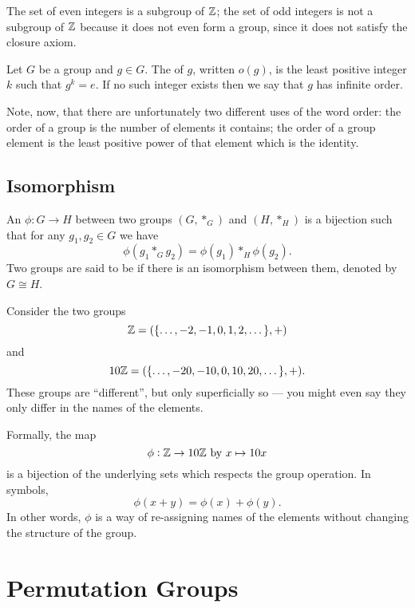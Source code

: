 \begin{example}
The set of even integers is a subgroup of $\mathbb Z$; the set of odd integers is not a subgroup of $\mathbb Z$ because it does not even form a group, since it does not satisfy the closure axiom.
\end{example}

\begin{definition}
Let $G$ be a group and $g \in G$. The  of $g$, written $o(g)$, is the least positive integer $k$ such that $g^k=e$. If no such integer exists then we say that $g$ has infinite order.
\end{definition}

\begin{remark}
Note, now, that there are unfortunately two different uses of the word order: the order of a group is the number of elements it contains; the order of a group element is the least positive power of that element which is the identity.
\end{remark}
\pagebreak

\subsection{Isomorphism}
\begin{definition}[Isomorphism]
An  $\phi: G \to H$ between two groups $(G,\ast_G)$ and $(H,\ast_H)$ is a bijection such that for any $g_1,g_2 \in G$ we have
\[ \phi(g_1 \ast_G g_2) = \phi(g_1) \ast_H \phi(g_2). \]
Two groups are said to be  if there is an isomorphism between them, denoted by $G \cong H$.
\end{definition}

\begin{example}[$\ZZ\cong10\ZZ$]
Consider the two groups
\[ \mathbb Z = (\{\dots, -2, -1, 0, 1, 2, \dots\}, +) \] and
\[ 10\mathbb Z = (\{\dots, -20, -10, 0, 10, 20, \dots\}, +). \]
These groups are ``different'', but only superficially so --- you might even say they only differ in the names of the elements.

Formally, the map
\[ \phi: \mathbb Z \to 10\mathbb Z \text{ by } x \mapsto 10x \]
is a bijection of the underlying sets which respects the group operation. In symbols,
\[ \phi(x+y) = \phi(x) + \phi(y). \]
In other words, $\phi$ is a way of re-assigning names of the elements without changing the structure of the group.
\end{example}
\pagebreak

\section{Permutation Groups}

